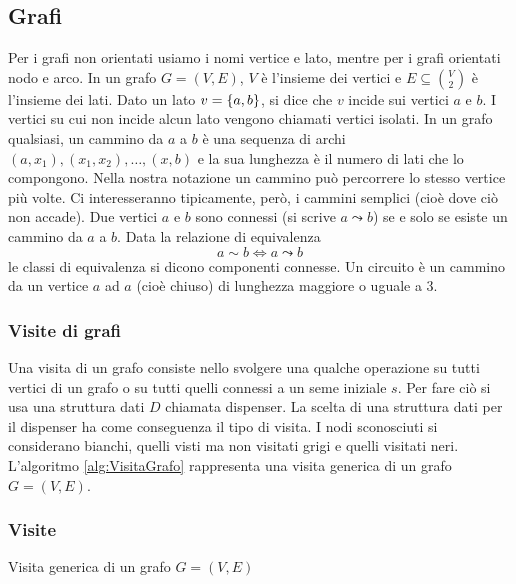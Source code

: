 \subsection*{Grafi}
Per i grafi non orientati usiamo i nomi vertice e lato, mentre per i grafi orientati nodo e arco. In un grafo $G=(V,E)$, $V$ è l'insieme dei vertici e $E\subseteq\binom{V}{2}$ è l'insieme dei lati.
Dato un lato $v=\left\{ a,b \right\}$, si dice che $v$ incide sui vertici $a$ e $b$. I vertici su cui non incide alcun lato vengono chiamati vertici isolati.
In un grafo qualsiasi, un cammino da $a$ a $b$ è una sequenza di archi $(a,x_1),(x_1,x_2),\dots,(x,b)$ e la sua lunghezza è il numero di lati che lo compongono. Nella nostra notazione un cammino può percorrere lo stesso vertice più volte. Ci interesseranno tipicamente, però, i cammini semplici (cioè dove ciò non accade). Due vertici $a$ e $b$ sono connessi (si scrive $a\leadsto b$) se e solo se esiste un cammino da $a$ a $b$. Data la relazione di equivalenza
\begin{equation*}
	a\sim b \iff a\leadsto b
\end{equation*}
le classi di equivalenza si dicono componenti connesse. Un circuito è un cammino da un vertice $a$ ad $a$ (cioè chiuso) di lunghezza maggiore o uguale a $3$.

\subsubsection*{Visite di grafi}
Una visita di un grafo consiste nello svolgere una qualche operazione su tutti vertici di un grafo o su tutti quelli connessi a un seme iniziale $s$. Per fare ciò si usa una struttura dati $D$ chiamata dispenser. La scelta di una struttura dati per il dispenser ha come conseguenza il tipo di visita. I nodi sconosciuti si considerano bianchi, quelli visti ma non visitati grigi e quelli visitati neri. L'algoritmo \ref{alg:VisitaGrafo} rappresenta una visita generica di un grafo $G=(V,E)$.

\subsubsection{Visite}
\begin{algorithm}
	
	\caption{Visita generica di un grafo $G=(V,E)$}
	\label{alg:VisitaGrafo}
\end{algorithm}
